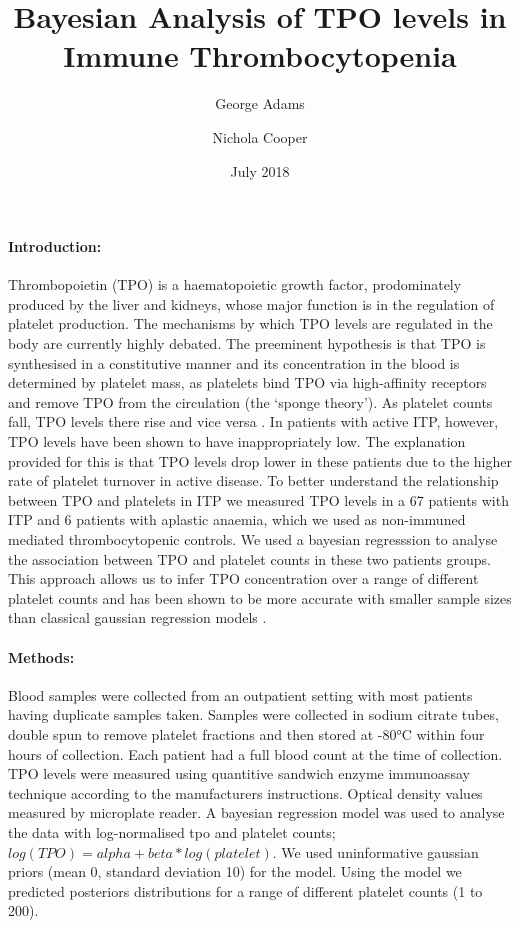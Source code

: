 \documentclass[11pt]{article}
\title{Bayesian Analysis of TPO levels in Immune Thrombocytopenia}
\author[1,2]{\small George Adams}
\author[1,2]{\small Nichola Cooper}
\affil[1]{\footnotesize Imperial College London, Kensington, London SW7 2AZ}
\affil[2]{\footnotesize Hammersmith Hospital, Imperial College NHS Trust, London W12 0HS}
\date{July 2018}
\begin{document}
\maketitle

\paragraph{Introduction:} Thrombopoietin (TPO) is a haematopoietic growth factor, prodominately produced by the liver and kidneys, whose major function is in the regulation of platelet production. The mechanisms by which TPO levels are regulated in the body are currently highly debated. The preeminent hypothesis is that TPO is synthesised in a constitutive manner and its concentration in the blood is determined by platelet mass, as platelets bind TPO via high-affinity receptors and remove TPO from the circulation (the `sponge theory'). As platelet counts fall, TPO levels there rise and vice versa \cite{EtoLinkagemechanismsthrombocytopenia2016}. In patients with active ITP, however, TPO levels have been shown to have inappropriately low. The explanation provided for this is that TPO levels drop lower in these patients due to the higher rate of platelet turnover in active disease. To better understand the relationship between TPO and platelets in ITP we measured TPO levels in a 67 patients with ITP and 6 patients with aplastic anaemia, which we used as non-immuned mediated thrombocytopenic controls. We used a bayesian regresssion to analyse the association between TPO and platelet counts in these two patients groups. This approach allows us to infer TPO concentration over a range of different platelet counts and has been shown to be more accurate with smaller sample sizes than classical gaussian regression models \cite{GoldsteinBayesiananalysisregression1976}.


\paragraph{Methods:} Blood samples were collected from an outpatient setting with most patients having duplicate samples taken. Samples were collected in sodium citrate tubes, double spun to remove platelet fractions and then stored at -80°C within four hours of collection. Each patient had a full blood count at the time of collection. TPO levels were measured using quantitive sandwich enzyme immunoassay technique according to the manufacturers instructions. Optical density values measured by microplate reader. A bayesian regression model was used to analyse the data with log-normalised tpo and platelet counts; $log(TPO) = alpha + beta*log(platelet)$. We used uninformative gaussian priors (mean 0, standard deviation 10) for the model. Using the model we predicted posteriors distributions for a range of different platelet counts (1 to 200).
\end{document}

